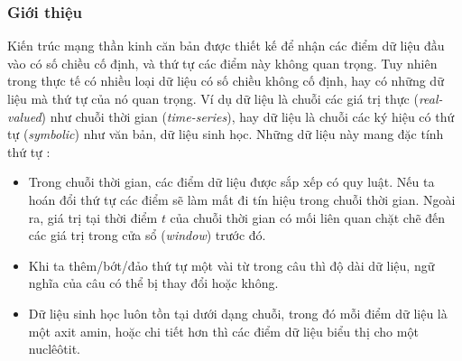 \subsubsection{Giới thiệu}
Kiến trúc mạng thần kinh căn bản được thiết kế để nhận các điểm dữ liệu đầu vào có số chiều cố định, và thứ tự các điểm này không quan trọng. Tuy nhiên trong thực tế có nhiều loại dữ liệu có số chiều không cố định, hay có những dữ liệu mà thứ tự của nó quan trọng. Ví dụ dữ liệu là chuỗi các giá trị thực (\textit{real-valued}) như chuỗi thời gian (\textit{time-series}), hay dữ liệu là chuỗi các ký hiệu có thứ tự (\textit{symbolic}) như văn bản, dữ liệu sinh học. Những dữ liệu này mang đặc tính thứ tự \cite{Aggarwal2023-zk}:
\begin{itemize}
    \item Trong chuỗi thời gian, các điểm dữ liệu được sắp xếp có quy luật. Nếu ta hoán đổi thứ tự các điểm sẽ làm mất đi tín hiệu trong chuỗi thời gian. Ngoài ra, giá trị tại thời điểm $t$ của chuỗi thời gian có mối liên quan chặt chẽ đến các giá trị trong cửa sổ (\textit{window}) trước đó.
    \item Khi ta thêm/bớt/đảo thứ tự một vài từ trong câu thì độ dài dữ liệu, ngữ nghĩa của câu có thể bị thay đổi hoặc không.
    \item Dữ liệu sinh học luôn tồn tại dưới dạng chuỗi, trong đó mỗi điểm dữ liệu là một axit amin, hoặc chi tiết hơn thì các điểm dữ liệu biểu thị cho một nuclêôtit.
\end{itemize}
